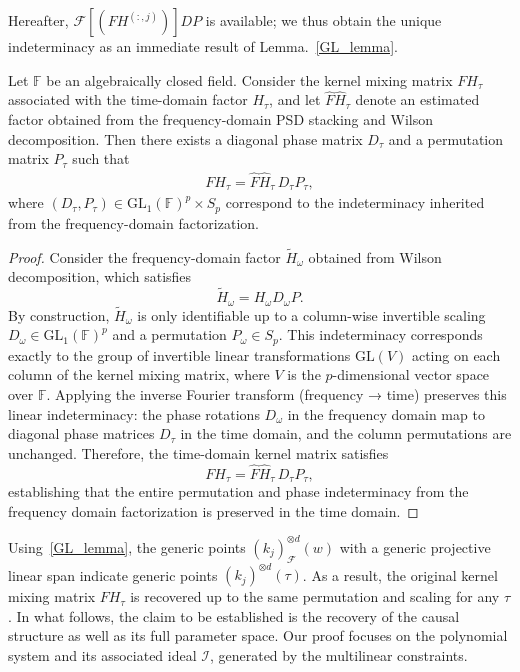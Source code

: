 \documentclass[10pt]{article}
\newcommand{\F}{\mathbb{F}}
\newcommand{\GL}{\mathrm{GL}}
\numberwithin{figure}{section}
\begin{document}
Hereafter, \(\mathcal{F}\left[ \left( F H^{(:,j)} \right)\right]DP\) is available; we thus obtain the unique indeterminacy as an immediate result of Lemma.~\ref{GL_lemma}.  

\begin{alemma}\label{GL_lemma}
Let $\F$ be an algebraically closed field. Consider the kernel mixing matrix $F H_\tau$ associated with the time-domain factor $H_\tau$, and let $\hat F \hat H_\tau$ denote an estimated factor obtained from the frequency-domain PSD stacking and Wilson decomposition. Then there exists a diagonal phase matrix $D_\tau$ and a permutation matrix $P_\tau$ such that
\begin{align*}
F H_\tau = \hat F \hat H_\tau \, D_\tau P_\tau,
\end{align*}
where $(D_\tau, P_\tau) \in \GL_1(\F)^p \times S_p$ correspond to the indeterminacy inherited from the frequency-domain factorization.
\end{alemma}

\begin{proof}
Consider the frequency-domain factor $\tilde H_\omega$ obtained from Wilson decomposition, which satisfies
\[
 \tilde H_\omega =  H_\omega D_{\omega}P.
\]
By construction, $\tilde H_\omega$ is only identifiable up to a column-wise invertible scaling $D_\omega \in \GL_1(\F)^p$ and a permutation $P_\omega \in S_p$. This indeterminacy corresponds exactly to the group of invertible linear transformations $\GL(V)$ acting on each column of the kernel mixing matrix, where $V$ is the $p$-dimensional vector space over $\F$. Applying the inverse Fourier transform (frequency → time) preserves this linear indeterminacy: the phase rotations $D_\omega$ in the frequency domain map to diagonal phase matrices $D_\tau$ in the time domain, and the column permutations are unchanged. Therefore, the time-domain kernel matrix satisfies
\[
F H_\tau = \hat F \hat H_\tau \, D_\tau P_\tau,
\]
establishing that the entire permutation and phase indeterminacy from the frequency domain factorization is preserved in the time domain.
\end{proof}

Using~\autoref{GL_lemma}, the generic points $\left( k_j \right)_{\mathcal{F}}^{\otimes d}(w)$ with a generic projective linear span indicate generic points $\left( k_j \right)^{\otimes d}(\tau)$. As a result, the original kernel mixing matrix $FH_{\tau}$ is recovered up to the same permutation and scaling for any $\tau$. In what follows, the claim to be established is the recovery of the causal structure as well as its full parameter space. Our proof focuses on the polynomial system and its associated ideal $\mathcal{I}$, generated by the multilinear constraints. 
\end{document}
